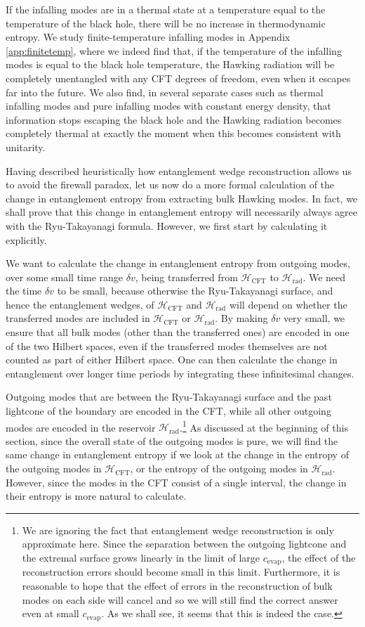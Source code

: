 \documentclass[11pt,a4paper]{article}
\begin{document}
If the infalling modes are in a thermal state at a temperature equal to the temperature of the black hole, there will be no increase in thermodynamic entropy. We study finite-temperature infalling modes in Appendix \ref{app:finitetemp}, where we indeed find that, if the temperature of the infalling modes is equal to the black hole temperature, the Hawking radiation will be completely unentangled with any CFT degrees of freedom, even when it escapes far into the future. We also find, in several separate cases such as thermal infalling modes and pure infalling modes with constant energy density, that information stops escaping the black hole and the Hawking radiation becomes completely thermal at exactly the moment when this becomes consistent with unitarity.

Having described heuristically how entanglement wedge reconstruction allows us to avoid the firewall paradox, let us now do a more formal calculation of the change in entanglement entropy from extracting bulk Hawking modes. In fact, we shall prove that this change in entanglement entropy will necessarily always agree with the Ryu-Takayanagi formula. However, we first start by calculating it explicitly.

We want to calculate the change in entanglement entropy from outgoing modes, over some small time range $\delta v$, being transferred from $\mathcal{H}_\text{CFT}$ to $\mathcal{H}_\text{rad}$. We need the time $\delta v$ to be small, because otherwise the Ryu-Takayanagi surface, and hence the entanglement wedges, of $\mathcal{H}_\text{CFT}$ and $\mathcal{H}_\text{rad}$ will depend on whether the transferred modes are included in $\mathcal{H}_\text{CFT}$ or $\mathcal{H}_\text{rad}$. By making $\delta v$ very small, we ensure that all bulk modes (other than the transferred ones) are encoded in one of the two Hilbert spaces, even if the transferred modes themselves are not counted as part of either Hilbert space. One can then calculate the change in entanglement over longer time periods by integrating these infinitesimal changes.

Outgoing modes that are between the Ryu-Takayanagi surface and the past lightcone of the boundary are encoded in the CFT, while all other outgoing modes are encoded in the reservoir $\mathcal{H}_\text{rad}$.\footnote{We are ignoring the fact that entanglement wedge reconstruction is only approximate here. Since the separation between the outgoing lightcone and the extremal surface grows linearly  in the limit of large $c_\text{evap}$, the effect of the reconstruction errors should become small in this limit. Furthermore, it is reasonable to hope that the effect of errors in the reconstruction of bulk modes on each side will cancel and so we will still find the correct answer even at small $c_\text{evap}$. As we shall see, it seems that this is indeed the case.}  As discussed at the beginning of this section, since the overall state of the outgoing modes is pure, we will find the same change in entanglement entropy if we look at the change in the entropy of the outgoing modes in $\mathcal{H}_\text{CFT}$, or the entropy of the outgoing modes in $\mathcal{H}_\text{rad}$. However, since the modes in the CFT consist of a single interval, the change in their entropy is more natural to calculate.
\end{document}
